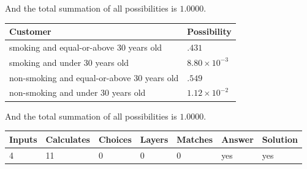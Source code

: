 \documentclass[12pt]{article}
\begin{document}
\noindent
And the total summation of all possibilities is $  %
1.0000 $.
 
 
 
 
\noindent{}
 
 

 
 
 
\noindent{}
 
 

 
\noindent
\begin{tabular}{|l|l|}
\hline
Customer & Possibility \\
\hline
smoking  and  %
equal-or-above 30 years old &
  $ %
.431$ \\
\hline
smoking  and  %
under 30 years old &
  $ %
8.80 \times 10^{-3}$ \\
\hline
 non-smoking and  %
equal-or-above 30 years old &
  $ %
.549$ \\
\hline
 non-smoking and  %
under 30 years old &
  $ %
1.12 \times 10^{-2}$ \\
\hline
\end{tabular}
 
\noindent
 And the total summation of all possibilities is $  %
1.0000 $.
 
 
 
\noindent{}
 
 

 
\vspace{0.3in}
   
   
   
   
\noindent\begin{tabular}{|l|l|l|l|l|l|l|}
 \hline
Inputs & Calculates & Choices & Layers & Matches & Answer & Solution \\ \hline
           4 & 
          11 & 
           0
  & 
           0 & 
           0 & 
  yes & 
  yes 
  \\ \hline
 \end{tabular}
   
   
   
   
\noindent{}
   
   
  
\end{document}
